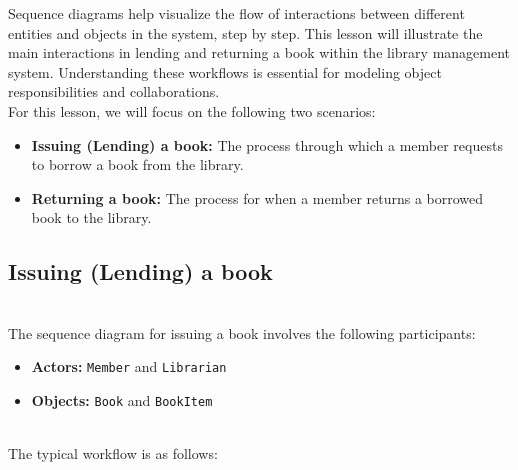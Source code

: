 

Sequence diagrams help visualize the flow of interactions between different entities and objects in the system, step by step. This lesson will illustrate the main interactions in lending and returning a book within the library management system. Understanding these workflows is essential for modeling object responsibilities and collaborations.
\\
For this lesson, we will focus on the following two scenarios:

\begin{itemize}
\item
\protect{}\label{lEigJCxUCZa-Q2wnHRRI3}
\textbf{Issuing (Lending) a book:} The process through which a member requests to borrow a book from the library.
\item
\protect{}\label{OmgU-1Sga5MYpMvnLj9dl}
\textbf{Returning a book:} The process for when a member returns a borrowed book to the library.
\end{itemize}

\subsection{Issuing (Lending) a book}\label{mMU7SolVaBdffq7vaUkCT}
\\
The sequence diagram for issuing a book involves the following participants:

\begin{itemize}
\item
\protect{}\label{35IHkTCdUBR1yiRuiT0BH}
\textbf{Actors:} \texttt{Member} and \texttt{Librarian}
\item
\protect{}\label{nmh1-Lx73rQiA8PMRecrf}
\textbf{Objects:} \texttt{Book} and \texttt{BookItem}
\end{itemize}
\\
The typical workflow is as follows:

